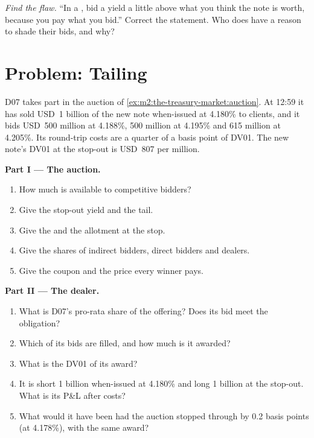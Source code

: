 \begin{exercise}[$\star\star\star$]\label{exo:m2:the-treasury-market:8}
\emph{Find the flaw.} ``In a , bid a yield a little above
what you think the note is worth, because you pay what you bid.'' Correct the
statement. Who does have a reason to shade their bids, and why?
\end{exercise}

\section{Problem: Tailing}

\begin{problem}\label{pb:m2:the-treasury-market:1}
 D07 takes part in the auction of \cref{ex:m2:the-treasury-market:auction}.
At 12:59 it has sold USD~1 billion of the new note when-issued at 4.180\% to
clients, and it bids USD~500 million at 4.188\%, 500 million at 4.195\% and 615
million at 4.205\%. Its round-trip costs are a quarter of a basis point of
DV01. The new note's DV01 at the stop-out is USD~807 per million.

\medskip\noindent\textbf{Part I --- The auction.}
\begin{enumerate}
\item How much is available to competitive bidders?
\item Give the stop-out yield and the tail.
\item Give the  and the allotment at the stop.
\item Give the shares of indirect bidders, direct bidders and dealers.
\item Give the coupon and the price every winner pays.
\end{enumerate}

\medskip\noindent\textbf{Part II --- The dealer.}
\begin{enumerate}[resume]
\item What is D07's pro-rata share of the offering? Does its bid meet the
obligation?
\item Which of its bids are filled, and how much is it awarded?
\item What is the DV01 of its award?
\item It is short 1 billion when-issued at 4.180\% and long 1 billion at the
stop-out. What is its P\&L after costs?
\item What would it have been had the auction stopped through by 0.2 basis
points (at 4.178\%), with the same award?
\end{enumerate}


\end{problem}
